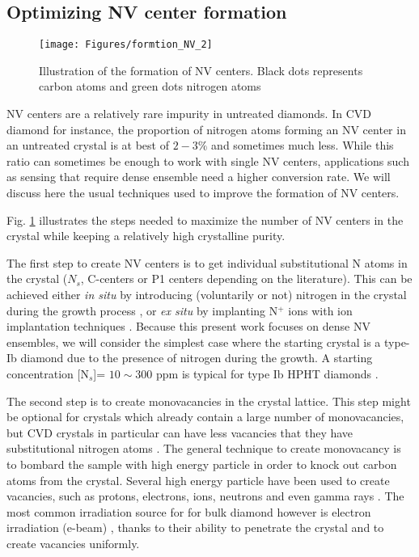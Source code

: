\documentclass[a4paper,11pt]{report}
\begin{document}
\subsection{Optimizing NV center formation}
\begin{figure}[h!]
\centering
\texttt{[image: Figures/formtion\_NV\_2]}
\caption{Illustration of the formation of NV centers. Black dots represents carbon atoms and green dots nitrogen atoms}
\label{formation NV}
\end{figure}

NV centers are a relatively rare impurity in untreated diamonds. In CVD diamond for instance, the proportion of nitrogen atoms forming an NV center in an untreated crystal is at best of $2-3 \%$ \citep{hartland2014study} and sometimes much less. While this ratio can sometimes be enough  to work with single NV centers, applications such as sensing that require dense ensemble need a higher conversion rate. We will discuss here the usual techniques used to improve the formation of NV centers.

Fig. \ref{formation NV} illustrates the steps needed to maximize the number of NV centers in the crystal while keeping a relatively high crystalline purity.

The first step to create NV centers is to get individual substitutional N atoms in the crystal ($N_s$, C-centers or P1 centers depending on the literature). This can be achieved either \textit{in situ} by introducing (voluntarily or not) nitrogen in the crystal during the growth process \citep{tallaire2006characterisation, lobaev2017influence}, or \textit{ex situ} by implanting N$^+$ ions with ion implantation techniques \citep{meijer2005generation, smith2019colour}. Because this present work focuses on dense NV ensembles, we will consider the simplest case where the starting crystal is a type-Ib diamond due to the presence of nitrogen during the growth. A starting concentration [N$_s$]= $10 \sim 300$ ppm is typical for type Ib HPHT diamonds \citep{achard2020chemical}.

The second step is to create monovacancies in the crystal lattice. This step might be optional for crystals which already contain a large number of monovacancies, but CVD crystals in particular can have less vacancies that they have substitutional nitrogen atoms \citep{mainwood1999point}. The general technique to create monovacancy is to bombard the sample with high energy particle in order to knock out carbon atoms from the crystal. Several high energy particle have been used to create vacancies, such as protons, electrons, ions, neutrons and even gamma rays \citep{davies1976optical, ashbaugh1988gemstone, kleinsasser2016high}. The most common irradiation source for for bulk diamond however is electron irradiation (e-beam) \citep{acosta2009diamonds}, thanks to their ability to penetrate the crystal and to create vacancies uniformly.
\end{document}
